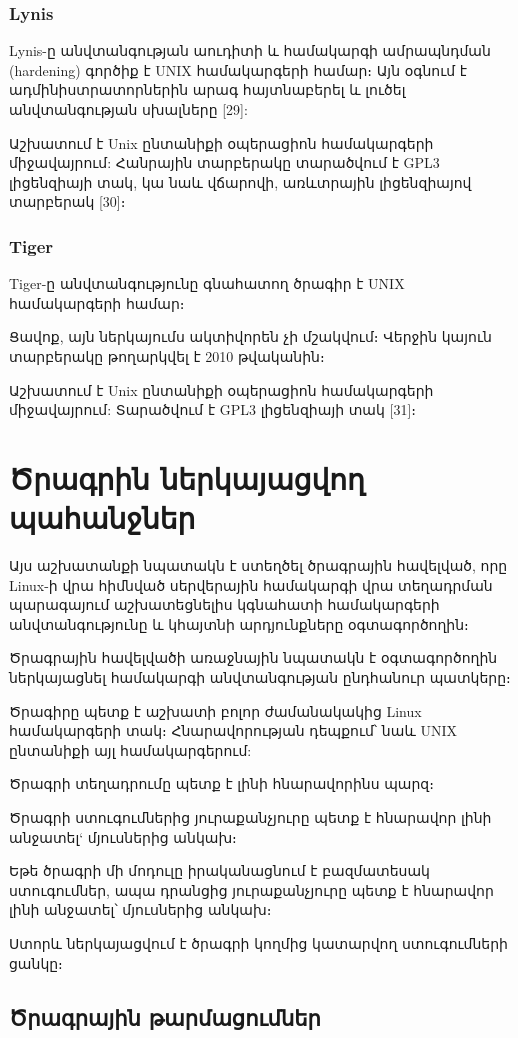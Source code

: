 \documentclass[a4paper,12pt]{article}
\begin{document}
\begin{sloppypar}
\subsubsection{Lynis}


Lynis-ը անվտանգության աուդիտի և համակարգի ամրապնդման (hardening)
գործիք է UNIX համակարգերի համար։
Այն օգնում է ադմինիստրատորներին արագ հայտնաբերել և լուծել
անվտանգության սխալները [29]:

Աշխատում է Unix ընտանիքի օպերացիոն համակարգերի միջավայրում:
Հանրային տարբերակը տարածվում է GPL3 լիցենզիայի տակ, կա նաև վճարովի,
առևտրային լիցենզիայով տարբերակ [30]։


\subsubsection{Tiger}


Tiger-ը անվտանգությունը գնահատող ծրագիր է UNIX համակարգերի համար։

Ցավոք, այն ներկայումս ակտիվորեն չի մշակվում։ Վերջին կայուն տարբերակը
թողարկվել է 2010 թվականին։

Աշխատում է Unix ընտանիքի օպերացիոն համակարգերի միջավայրում:
Տարածվում է GPL3 լիցենզիայի տակ [31]։


\section{Ծրագրին ներկայացվող պահանջներ}


Այս աշխատանքի նպատակն է ստեղծել ծրագրային հավելված, որը Linux-ի
վրա հիմնված սերվերային համակարգի վրա տեղադրման պարագայում
աշխատեցնելիս կգնահատի համակարգերի անվտանգությունը և կհայտնի
արդյունքները օգտագործողին։

Ծրագրային հավելվածի առաջնային նպատակն է օգտագործողին ներկայացնել
համակարգի անվտանգության ընդհանուր պատկերը։

Ծրագիրը պետք է աշխատի բոլոր ժամանակակից Linux համակարգերի տակ։
Հնարավորության դեպքում՝ նաև UNIX ընտանիքի այլ համակարգերում:

Ծրագրի տեղադրումը պետք է լինի հնարավորինս պարզ։

Ծրագրի ստուգումներից յուրաքանչյուրը պետք է հնարավոր լինի անջատել`
մյուսներից անկախ։

Եթե ծրագրի մի մոդուլը իրականացնում է բազմատեսակ ստուգումներ,
ապա դրանցից յուրաքանչյուրը պետք է հնարավոր լինի անջատել՝
մյուսներից անկախ։

Ստորև ներկայացվում է ծրագրի կողմից կատարվող ստուգումների ցանկը։


\subsection{Ծրագրային թարմացումներ}


\end{sloppypar}
\end{document}
